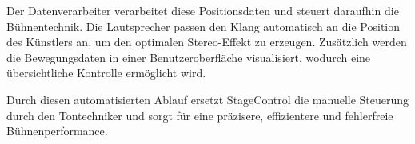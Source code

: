 Der Datenverarbeiter verarbeitet diese Positionsdaten und steuert daraufhin die Bühnentechnik. Die Lautsprecher passen den Klang automatisch an die Position des Künstlers an, um den optimalen Stereo-Effekt zu erzeugen.  Zusätzlich werden die Bewegungsdaten in einer Benutzeroberfläche visualisiert, wodurch eine übersichtliche Kontrolle  ermöglicht wird.  

Durch diesen automatisierten Ablauf ersetzt StageControl die manuelle Steuerung durch den Tontechniker und sorgt für eine präzisere, effizientere und fehlerfreie Bühnenperformance.